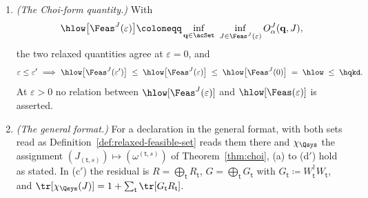 \begin{proposition}
\begin{enumerate}[label=(\alph*),leftmargin=2.4em]
  \begin{equation}\label{eq:feas-tol-mono}
    \varepsilon\le\varepsilon'\ \Longrightarrow\
    \hlow\big[\Feas(\varepsilon')\big]\;\le\;\hlow\big[\Feas(\varepsilon)\big]
    \;\le\;\hlow\big[\Feas(0)\big]=\hlow\;\le\;\hqkd .
  \end{equation}
\item[(d$'$)] \emph{(The Choi-form quantity.)} With
  \begin{equation}\label{eq:hlow-feasJ}
    \hlow\big[\Feas^{J}(\varepsilon)\big]\coloneqq
    \inf_{\mathbf q\in\acSet}\ \inf_{J\in\Feas^{J}(\varepsilon)}
    O^{J}_{\alpha}(\mathbf q,J),
  \end{equation}
  the two relaxed quantities agree at $\varepsilon=0$, and
  \begin{equation}\label{eq:feas-tol-mono-J}
    \varepsilon\le\varepsilon'\ \Longrightarrow\
    \hlow\big[\Feas^{J}(\varepsilon')\big]\;\le\;
    \hlow\big[\Feas^{J}(\varepsilon)\big]\;\le\;
    \hlow\big[\Feas^{J}(0)\big]\;=\;\hlow\;\le\;\hqkd .
  \end{equation}
  At $\varepsilon>0$ no relation between $\hlow[\Feas^{J}(\varepsilon)]$
  and $\hlow[\Feas(\varepsilon)]$ is asserted.
\item[(e)] \emph{(The general format.)} For a declaration in the general
  format, with both sets read as Definition~\ref{def:relaxed-feasible-set}
  reads them there and $\chi_{\Qsys}$ the assignment
  $(J_{(\mathsf t,s)})\mapsto(\omega^{(\mathsf t,s)})$ of
  Theorem~\ref{thm:choi}, (a) to (d$'$) hold as stated. In (c$'$) the
  residual is $R=\bigoplus_{\mathsf t}R_{\mathsf t}$, $G=\bigoplus_{\mathsf
  t}G_{\mathsf t}$ with $G_{\mathsf t}\coloneqq W_{\mathsf t}^{\dagger}
  W_{\mathsf t}$, and
  $\tr[\chi_{\Qsys}(J)]=1+\sum_{\mathsf t}\tr[G_{\mathsf t}R_{\mathsf t}]$.
\end{enumerate}
\end{proposition}

